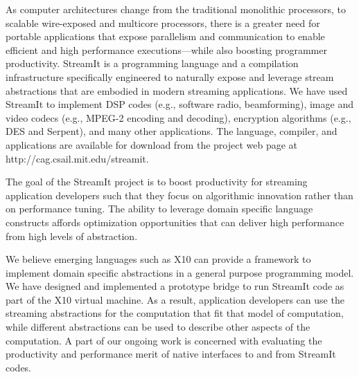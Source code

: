 \vspace{-11pt}

As computer architectures change from the traditional monolithic
processors, to scalable wire-exposed and multicore processors, there
is a greater need for portable applications that expose parallelism
and communication to enable efficient and high performance
executions---while also boosting programmer productivity. StreamIt is
a programming language and a compilation infrastructure specifically
engineered to naturally expose and leverage stream abstractions that
are embodied in modern streaming applications. We have used StreamIt
to implement DSP codes (e.g., software radio, beamforming), image and
video codecs (e.g., MPEG-2 encoding and decoding), encryption
algorithms (e.g., DES and Serpent), and many other applications. The
language, compiler, and applications are available for download from
the project web page at http://cag.csail.mit.edu/streamit.

The goal of the StreamIt project is to boost productivity for
streaming application developers such that they focus on algorithmic
innovation rather than on performance tuning. The ability to leverage
domain specific language constructs affords optimization opportunities
that can deliver high performance from high levels of abstraction. 

We believe emerging languages such as X10 can provide a framework to
implement domain specific abstractions in a general purpose
programming model. We have designed and implemented a prototype bridge
to run StreamIt code as part of the X10 virtual machine. As a result,
application developers can use the streaming abstractions for the
computation that fit that model of computation, while different
abstractions can be used to describe other aspects of the computation.
A part of our ongoing work is concerned with evaluating the productivity
and performance merit of native interfaces to and from StreamIt codes.